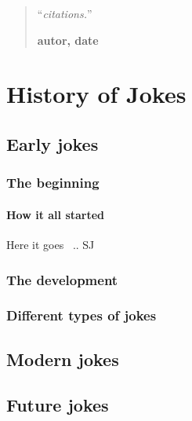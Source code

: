 \documentclass[11pt,a4paper,oneside]{book}
\begin{document}
\medskip

\begin{quotation}
\noindent ``\emph{citations.}''
\begin{flushright}\textbf{autor, date}\end{flushright}
\end{quotation}

%

\setcounter{page}{0}
\tableofcontents

\printglossaries

\mainmatter 


%

\part{History of Jokes}
\label{part:hj}

\chapter{Early jokes}
\label{ch:ej}

\section{The beginning}
\label{sec:beginning}

\subsection{How it all started}
\label{subsec:start}
%
Here it goes~\cite{encyclopedia_of_jokes} .. \gls{SJ}
\section{The development}
\section{Different types of jokes}


\chapter{Modern jokes}

\chapter{Future jokes}
\end{document}
